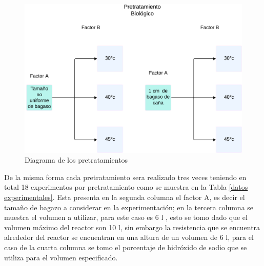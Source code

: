 \documentclass[12pt]{article}
\begin{document}
		\begin{figure} [h!]
			\centering
			\includegraphics[width=0.7\linewidth]{imagenes/diagrama biologico}
			\caption{Diagrama de los pretratamientos}
			\label{Diagrama biologico}
		\end{figure}
		\newpage
		De la misma forma cada pretratamiento sera realizado tres veces teniendo en total 18 experimentos por pretratamiento como se muestra en la Tabla \ref{datos experimentales}. Esta presenta en la segunda columna el factor A, es decir el tamaño de bagazo a considerar en la experimentación; en la tercera columna se muestra el volumen a utilizar, para este caso es 6 l , esto se tomo dado que el volumen máximo del reactor son 10 l, sin embargo  la resistencia que se encuentra alrededor del reactor se encuentran en una altura de un volumen de 6 l, para el caso de la cuarta columna se tomo el porcentaje de hidróxido de sodio que se utiliza para el volumen especificado.
		
\end{document}
